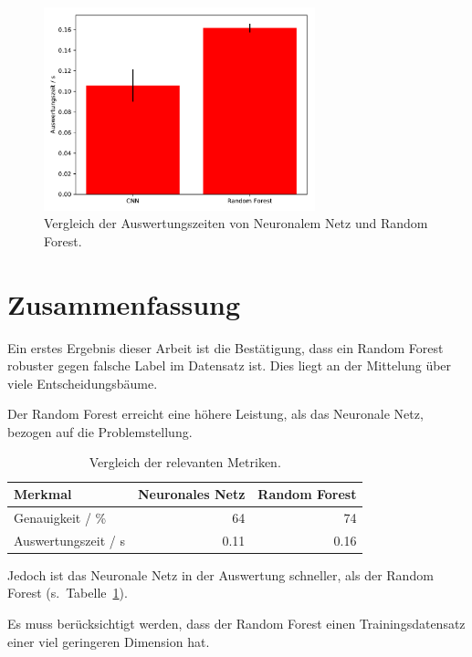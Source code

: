 \begin{figure}
\centering
\includegraphics[width=0.7\textwidth]{content/time.pdf}
\caption{Vergleich der Auswertungszeiten von Neuronalem Netz und Random
Forest.}%
\label{fig:times}
\end{figure}

\hypertarget{zusammenfassung}{%
\section{Zusammenfassung}\label{zusammenfassung}}

Ein erstes Ergebnis dieser Arbeit ist die Bestätigung, dass ein Random
Forest robuster gegen falsche Label im Datensatz ist. Dies liegt an der
Mittelung über viele Entscheidungsbäume.

Der Random Forest erreicht eine höhere Leistung, als das Neuronale Netz,
bezogen auf die Problemstellung.

\begin{table}
  \centering
  \caption{Vergleich der relevanten Metriken.}%
  \label{tab:fazit}
  \begin{tabular}[]{@{}lrr@{}}
    \toprule
    Merkmal             & Neuronales Netz & Random Forest \\
    \midrule
    Genauigkeit / \%    & 64              & 74            \\
    Auswertungszeit / s & 0.11            & 0.16          \\
    \bottomrule
  \end{tabular}
\end{table}

Jedoch ist das Neuronale Netz in der Auswertung schneller, als der
Random Forest (s.~Tabelle~\ref{tab:fazit}).

Es muss berücksichtigt werden, dass der Random Forest einen
Trainingsdatensatz einer viel geringeren Dimension hat.

